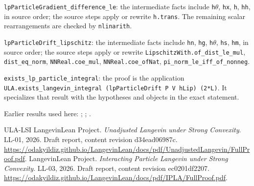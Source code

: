 \documentclass[11pt,a4paper]{article}
\begin{document}
\begin{leanbox}
\texttt{lp\allowbreak{}Particle\allowbreak{}Gradient\_\allowbreak{}difference\_\allowbreak{}le}: the intermediate facts include \texttt{h\ensuremath{\theta}}, \texttt{hx}, \texttt{h}, \texttt{hh}, in source order; the source steps apply or rewrite \texttt{h.\allowbreak{}trans}. The remaining scalar rearrangements are checked by \texttt{nlinarith}.



\texttt{lp\allowbreak{}Particle\allowbreak{}Drift\_\allowbreak{}lipschitz}: the intermediate facts include \texttt{hn}, \texttt{hg}, \texttt{h\ensuremath{\theta}}, \texttt{hs}, \texttt{hm}, in source order; the source steps apply or rewrite \texttt{Lipschitz\allowbreak{}With.\allowbreak{}of\_\allowbreak{}dist\_\allowbreak{}le\_\allowbreak{}mul}, \texttt{dist\_\allowbreak{}eq\_\allowbreak{}norm}, \texttt{NNReal.\allowbreak{}coe\_\allowbreak{}mul}, \texttt{NNReal.\allowbreak{}coe\_\allowbreak{}of\allowbreak{}Nat}, \texttt{pi\_\allowbreak{}norm\_\allowbreak{}le\_\allowbreak{}iff\_\allowbreak{}of\_\allowbreak{}nonneg}.



\texttt{exists\_\allowbreak{}lp\_\allowbreak{}particle\_\allowbreak{}integral}: the proof is the application \texttt{ULA.\allowbreak{}exists\_\allowbreak{}langevin\_\allowbreak{}integral (lp\allowbreak{}Particle\allowbreak{}Drift P V h\allowbreak{}Lip) (2*L)}. It specializes that result with the hypotheses and objects in the exact statement.
\end{leanbox}


Earlier results used here: \cite[Section~3.13.5]{LangevinLean2026ULASC}; \cite[Section~3.14.3]{LangevinLean2026ULASC}; \cite[Section~3.1.1]{LangevinLean2026IPLA}.

\begin{thebibliography}{ULA-LSI}
LangevinLean Project. \emph{Unadjusted Langevin under Strong Convexity}. LL-01, 2026. Draft report, content revision d34ead06987c. \url{https://odakyildiz.github.io/LangevinLean/docs/pdf/UnadjustedLangevin/FullProof.pdf}.
LangevinLean Project. \emph{Interacting Particle Langevin under Strong Convexity}. LL-03, 2026. Draft report, content revision ec0201df2207. \url{https://odakyildiz.github.io/LangevinLean/docs/pdf/IPLA/FullProof.pdf}.
\end{thebibliography}
\end{document}

